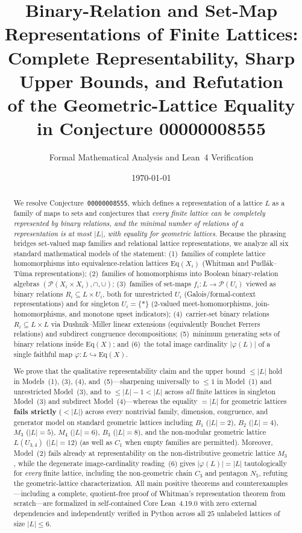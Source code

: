 \documentclass[11pt]{article}
\title{\textbf{Binary-Relation and Set-Map Representations of Finite Lattices:\\
Complete Representability, Sharp Upper Bounds, and Refutation\\
of the Geometric-Lattice Equality in Conjecture 00000008555}}
\author{Formal Mathematical Analysis and Lean~4 Verification}
\date{\today}
\theoremstyle{definition}
\theoremstyle{remark}
\newcommand{\Eq}{\mathrm{Eq}}
\newcommand{\Pow}{\mathcal{P}}
\begin{document}
\maketitle

\begin{abstract}
We resolve Conjecture~\texttt{00000008555}, which defines a representation of a lattice $L$ as a family of maps to sets and conjectures that \emph{every finite lattice can be completely represented by binary relations, and the minimal number of relations of a representation is at most $|L|$, with equality for geometric lattices}. Because the phrasing bridges set-valued map families and relational lattice representations, we analyze all six standard mathematical models of the statement: (1)~families of complete lattice homomorphisms into equivalence-relation lattices $\Eq(X_i)$ (Whitman and Pudl\'ak--T\r{u}ma representations); (2)~families of homomorphisms into Boolean binary-relation algebras $(\Pow(X_i \times X_i), \cap, \cup)$; (3)~families of set-maps $f_i \colon L \to \Pow(U_i)$ viewed as binary relations $R_i \subseteq L \times U_i$, both for unrestricted $U_i$ (Galois/formal-context representations) and for singleton $U_i = \{\ast\}$ ($2$-valued meet-homomorphisms, join-homomorphisms, and monotone upset indicators); (4)~carrier-set binary relations $R_i \subseteq L \times L$ via Dushnik--Miller linear extensions (equivalently Bouchet Ferrers relations) and subdirect congruence decompositions; (5)~minimum generating sets of binary relations inside $\Eq(X)$; and (6)~the total image cardinality $|\varphi(L)|$ of a single faithful map $\varphi \colon L \hookrightarrow \Eq(X)$.

We prove that the qualitative representability claim and the upper bound $\le |L|$ hold in Models~(1), (3), (4), and~(5)---sharpening universally to $\le 1$ in Model~(1) and unrestricted Model~(3), and to $\le |L|-1 < |L|$ across \emph{all} finite lattices in singleton Model~(3) and subdirect Model~(4)---whereas the equality $= |L|$ for geometric lattices \textbf{fails strictly} ($< |L|$) across every nontrivial family, dimension, congruence, and generator model on standard geometric lattices including $B_1$ ($|L|=2$), $B_2$ ($|L|=4$), $M_3$ ($|L|=5$), $M_4$ ($|L|=6$), $B_3$ ($|L|=8$), and the non-modular geometric lattice $L(U_{3,4})$ ($|L|=12$) (as well as $C_1$ when empty families are permitted). Moreover, Model~(2) fails already at representability on the non-distributive geometric lattice $M_3$, while the degenerate image-cardinality reading~(6) gives $|\varphi(L)| = |L|$ tautologically for \emph{every} finite lattice, including the non-geometric chain $C_3$ and pentagon $N_5$, refuting the geometric-lattice characterization. All main positive theorems and counterexamples---including a complete, quotient-free proof of Whitman's representation theorem from scratch---are formalized in self-contained Core Lean~4.19.0 with zero external dependencies and independently verified in Python across all $25$ unlabeled lattices of size $|L| \le 6$.
\end{abstract}
\end{document}
